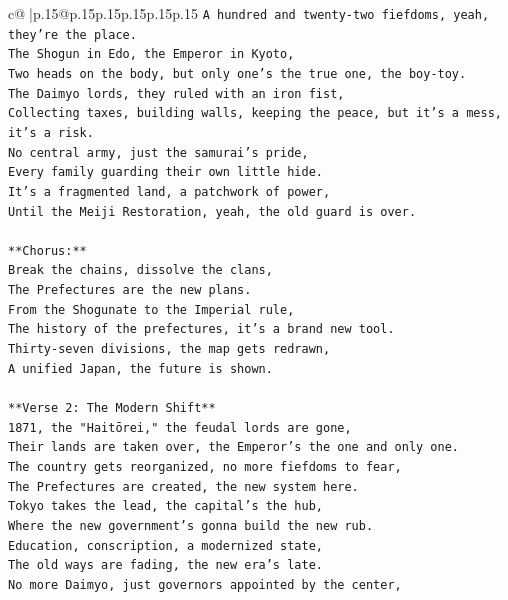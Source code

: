 \documentclass{article}
\begin{document}
{\begin{supertabular}{c@{$\;$}|p{.15\linewidth}@{}p{.15\linewidth}p{.15\linewidth}p{.15\linewidth}p{.15\linewidth}p{.15\linewidth}}
{{{\texttt{A hundred and twenty{-}two fiefdoms, yeah, they're the place.} \\
\texttt{The Shogun in Edo, the Emperor in Kyoto,} \\
\texttt{Two heads on the body, but only one's the true one, the boy{-}toy.} \\
\texttt{The Daimyo lords, they ruled with an iron fist,} \\
\texttt{Collecting taxes, building walls, keeping the peace, but it's a mess, it's a risk.} \\
\texttt{No central army, just the samurai's pride,} \\
\texttt{Every family guarding their own little hide.} \\
\texttt{It's a fragmented land, a patchwork of power,} \\
\texttt{Until the Meiji Restoration, yeah, the old guard is over.} \\
\\ 
\texttt{**Chorus:**} \\
\texttt{Break the chains, dissolve the clans,} \\
\texttt{The Prefectures are the new plans.} \\
\texttt{From the Shogunate to the Imperial rule,} \\
\texttt{The history of the prefectures, it's a brand new tool.} \\
\texttt{Thirty{-}seven divisions, the map gets redrawn,} \\
\texttt{A unified Japan, the future is shown.} \\
\\ 
\texttt{**Verse 2: The Modern Shift**} \\
\texttt{1871, the "Haitōrei," the feudal lords are gone,} \\
\texttt{Their lands are taken over, the Emperor's the one and only one.} \\
\texttt{The country gets reorganized, no more fiefdoms to fear,} \\
\texttt{The Prefectures are created, the new system here.} \\
\texttt{Tokyo takes the lead, the capital's the hub,} \\
\texttt{Where the new government's gonna build the new rub.} \\
\texttt{Education, conscription, a modernized state,} \\
\texttt{The old ways are fading, the new era's late.} \\
\texttt{No more Daimyo, just governors appointed by the center,} \\
}}}
\end{supertabular}}
\end{document}
